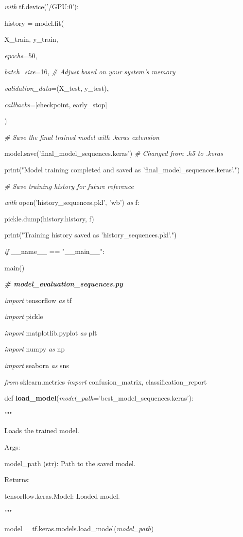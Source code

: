 \documentclass[
]{article}
\begin{document}
\emph{with} tf.device('/GPU:0'):

history = model.fit(

X\_train, y\_train,

\emph{epochs}=50,

\emph{batch\_size}=16, \emph{\# Adjust based on your system's memory}

\emph{validation\_data}=(X\_test, y\_test),

\emph{callbacks}={[}checkpoint, early\_stop{]}

)

\emph{\# Save the final trained model with .keras extension}

model.save('final\_model\_sequences.keras') \emph{\# Changed from .h5 to .keras}

print("Model training completed and saved as 'final\_model\_sequences.keras'.")

\emph{\# Save training history for future reference}

\emph{with} open('history\_sequences.pkl', 'wb') \emph{as} f:

pickle.dump(history.history, f)

print("Training history saved as 'history\_sequences.pkl'.")

\emph{if} \_\_name\_\_ == "\_\_main\_\_":

main()

\emph{\textbf{\# model\_evaluation\_sequences.py}}

\emph{import} tensorflow \emph{as} tf

\emph{import} pickle

\emph{import} matplotlib.pyplot \emph{as} plt

\emph{import} numpy \emph{as} np

\emph{import} seaborn \emph{as} sns

\emph{from} sklearn.metrics \emph{import} confusion\_matrix, classification\_report

def \textbf{load\_model}(\emph{model\_path}='best\_model\_sequences.keras'):

"""

Loads the trained model.

Args:

model\_path (str): Path to the saved model.

Returns:

tensorflow.keras.Model: Loaded model.

"""

model = tf.keras.models.load\_model(\emph{model\_path})
\end{document}
